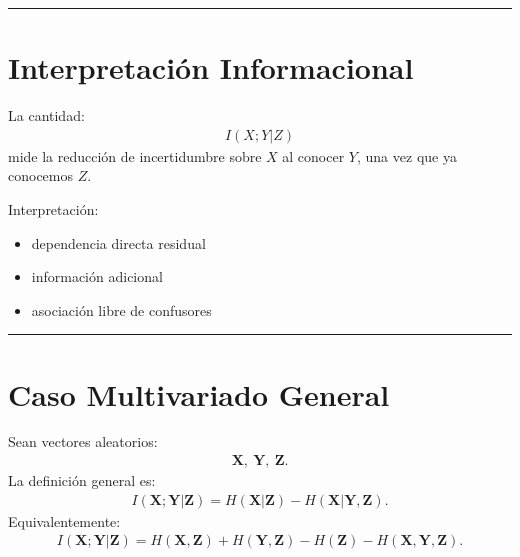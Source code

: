 \documentclass[letterpaper,10pt,english]{jupyterBook}
\begin{document}
\bigskip\hrule\bigskip



\section{Interpretación Informacional}
\label{\detokenize{03_multivariate_models/conditional_mi:interpretacion-informacional}}
\sphinxAtStartPar
La cantidad:
\begin{equation*}
\begin{split}
I(X;Y|Z)
\end{split}
\end{equation*}
\sphinxAtStartPar
mide la reducción de incertidumbre sobre \(X\) al conocer \(Y\),
una vez que ya conocemos \(Z\).

\sphinxAtStartPar
Interpretación:
\begin{itemize}
\item {} 
\sphinxAtStartPar
dependencia directa residual

\item {} 
\sphinxAtStartPar
información adicional

\item {} 
\sphinxAtStartPar
asociación libre de confusores

\end{itemize}


\bigskip\hrule\bigskip



\section{Caso Multivariado General}
\label{\detokenize{03_multivariate_models/conditional_mi:caso-multivariado-general}}
\sphinxAtStartPar
Sean vectores aleatorios:
\begin{equation*}
\begin{split}
\mathbf{X},\ \mathbf{Y},\ \mathbf{Z}.
\end{split}
\end{equation*}
\sphinxAtStartPar
La definición general es:
\begin{equation*}
\begin{split}
I(\mathbf{X};\mathbf{Y}|\mathbf{Z})
=
H(\mathbf{X}|\mathbf{Z})
-
H(\mathbf{X}|\mathbf{Y},\mathbf{Z}).
\end{split}
\end{equation*}
\sphinxAtStartPar
Equivalentemente:
\begin{equation*}
\begin{split}
I(\mathbf{X};\mathbf{Y}|\mathbf{Z})
=
H(\mathbf{X},\mathbf{Z})
+
H(\mathbf{Y},\mathbf{Z})
-
H(\mathbf{Z})
-
H(\mathbf{X},\mathbf{Y},\mathbf{Z}).
\end{split}
\end{equation*}
\end{document}
